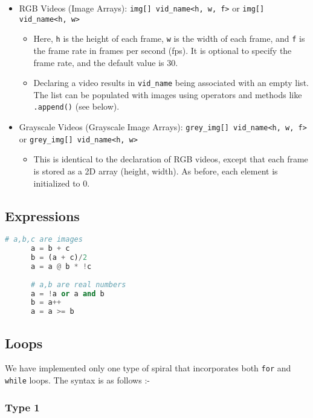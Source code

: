 \documentclass[a4paper, 11pt]{article}
\begin{document}
\begin{itemize}
        \item RGB Videos (Image Arrays): \texttt{img[] vid\_name<h, w, f>} or \texttt{img[] vid\_name<h, w>}
            \begin{itemize}
              \item Here, \texttt{h} is the height of each frame, \texttt{w} is the width of each frame, and \texttt{f} is the frame rate in frames per second (fps). It is optional to specify the frame rate, and the default value is $30$.
              \item Declaring a video results in \texttt{vid\_name} being associated with an empty list. The list can be populated with images using operators and methods like \texttt{.append()} (see below).
            \end{itemize}

        \item Grayscale Videos (Grayscale Image Arrays): \texttt{grey\_img[] vid\_name<h, w, f>} or \texttt{grey\_img[] vid\_name<h, w>}
            \begin{itemize}
              \item This is identical to the declaration of RGB videos, except that each frame is stored as a 2D array (height, width). As before, each element is initialized to 0.
            \end{itemize}
            
      \end{itemize}
    \subsection{Expressions}
    \begin{lstlisting}[language=Python]
      # a,b,c are images
      a = b + c
      b = (a + c)/2
      a = a @ b * !c
  
      # a,b are real numbers
      a = !a or a and b
      b = a++
      a = a >= b
      \end{lstlisting}
    \subsection{Loops}

    We have implemented only one type of spiral that incorporates both \texttt{for} and \texttt{while} loops. The syntax is as follows :-
    \subsubsection*{Type 1}
\end{document}
